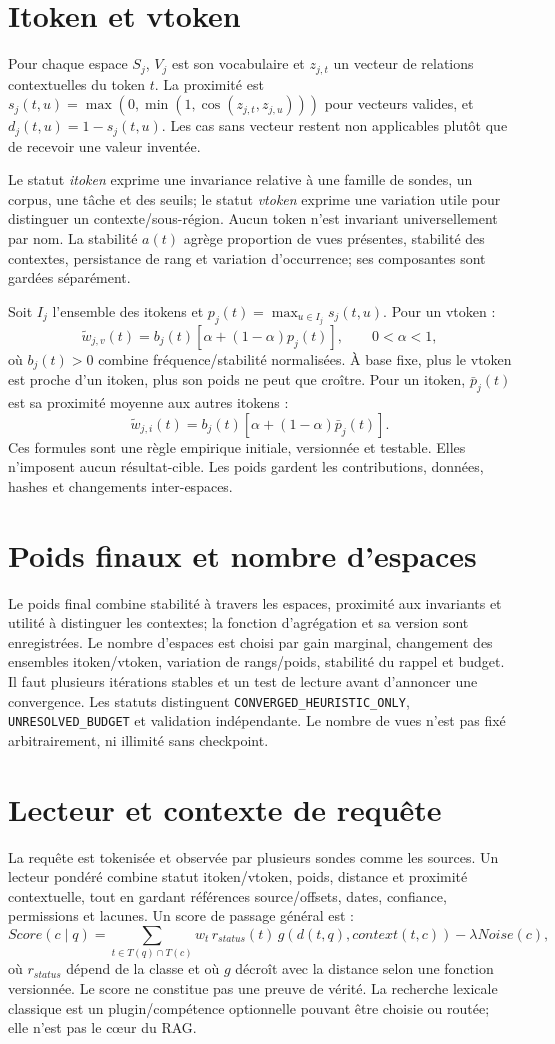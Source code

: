 \documentclass[11pt,a4paper]{report}
\begin{document}
\section{Itoken et vtoken}Pour chaque espace $S_j$, $V_j$ est son vocabulaire et $z_{j,t}$ un vecteur de relations contextuelles du token $t$. La proximité est $s_j(t,u)=\max(0,\min(1,\cos(z_{j,t},z_{j,u})))$ pour vecteurs valides, et $d_j(t,u)=1-s_j(t,u)$. Les cas sans vecteur restent non applicables plutôt que de recevoir une valeur inventée.

Le statut \emph{itoken} exprime une invariance relative à une famille de sondes, un corpus, une tâche et des seuils; le statut \emph{vtoken} exprime une variation utile pour distinguer un contexte/sous-région. Aucun token n'est invariant universellement par nom. La stabilité $a(t)$ agrège proportion de vues présentes, stabilité des contextes, persistance de rang et variation d'occurrence; ses composantes sont gardées séparément.

Soit $I_j$ l'ensemble des itokens et $p_j(t)=\max_{u\in I_j}s_j(t,u)$. Pour un vtoken :
\[
 \tilde w_{j,v}(t)=b_j(t)[\alpha+(1-\alpha)p_j(t)],\qquad 0<\alpha<1,
\]
où $b_j(t)>0$ combine fréquence/stabilité normalisées. À base fixe, plus le vtoken est proche d'un itoken, plus son poids ne peut que croître. Pour un itoken, $\bar p_j(t)$ est sa proximité moyenne aux autres itokens :
\[
 \tilde w_{j,i}(t)=b_j(t)[\alpha+(1-\alpha)\bar p_j(t)].
\]
Ces formules sont une règle empirique initiale, versionnée et testable. Elles n'imposent aucun résultat-cible. Les poids gardent les contributions, données, hashes et changements inter-espaces.
\section{Poids finaux et nombre d'espaces}Le poids final combine stabilité à travers les espaces, proximité aux invariants et utilité à distinguer les contextes; la fonction d'agrégation et sa version sont enregistrées. Le nombre d'espaces est choisi par gain marginal, changement des ensembles itoken/vtoken, variation de rangs/poids, stabilité du rappel et budget. Il faut plusieurs itérations stables et un test de lecture avant d'annoncer une convergence. Les statuts distinguent \texttt{CONVERGED\_HEURISTIC\_ONLY}, \texttt{UNRESOLVED\_BUDGET} et validation indépendante. Le nombre de vues n'est pas fixé arbitrairement, ni illimité sans checkpoint.
\section{Lecteur et contexte de requête}La requête est tokenisée et observée par plusieurs sondes comme les sources. Un lecteur pondéré combine statut itoken/vtoken, poids, distance et proximité contextuelle, tout en gardant références source/offsets, dates, confiance, permissions et lacunes. Un score de passage général est :
\[
 Score(c\mid q)=\sum_{t\in T(q)\cap T(c)}w_t\,r_{status}(t)\,g(d(t,q),context(t,c))-\lambda Noise(c),
\]
où $r_{status}$ dépend de la classe et où $g$ décroît avec la distance selon une fonction versionnée. Le score ne constitue pas une preuve de vérité. La recherche lexicale classique est un plugin/compétence optionnelle pouvant être choisie ou routée; elle n'est pas le cœur du RAG.
\end{document}
